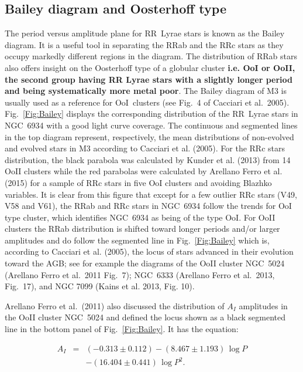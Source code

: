 \documentclass[journal]{rmaa}
\newcommand{\1}{\'{\i}}
\begin{document}
\subsection{Bailey diagram and Oosterhoff type}
\label{sec:Bailey}
The period versus amplitude plane for RR~Lyrae stars is known as the Bailey
diagram. It is a useful tool in separating the RRab and the RRc stars as they occupy
markedly different regions in the diagram. The distribution of RRab stars also
offers insight on the Oosterhoff type of a globular cluster {\bf i.e. OoI or OoII,
the second group having RR Lyrae stars with a slightly longer period and being
systematically more metal poor}. The Bailey diagram of
M3 is usually used as a reference for OoI~clusters (see Fig.~4 of Cacciari et al.\
2005).
Fig.~\ref{Fig:Bailey} displays the corresponding distribution of the RR~Lyrae stars
in NGC~6934 with a good light curve coverage. The continuous and segmented
lines in
the top diagram represent, respectively, the mean distributions of non-evolved and
evolved stars in M3 according to Cacciari et al. (2005). For the RRc stars
distribution, the black parabola was calculated by Kunder
et al. (2013) from 14 OoII clusters while the red parabolas were calculated by
Arellano Ferro et al. (2015) for a sample of RRc stars in five OoI clusters and
avoiding Blazhko variables. It is clear from this figure that except for a few
outlier RRc stars (V49, V58 and V61), the
RRab and RRc stars in NGC~6934 follow the trends for OoI type cluster, which
identifies NGC~6934 as being of the type OoI.
For OoII clusters the RRab distribution is shifted toward longer periods and/or larger
amplitudes and do follow the segmented line in Fig.~\ref{Fig:Bailey} which is,
according to Cacciari et al. (2005), the locus of stars advanced in their evolution
toward the AGB; see for example the diagrams of the OoII cluster NGC~5024 (Arellano
Ferro et al.\ 2011 Fig.~7); NGC~6333 (Arellano Ferro et al.\ 2013, Fig.~17), and NGC
7099 (Kains et al. 2013, Fig. 10).

Arellano Ferro et al.\ (2011) also discussed the distribution of $A_I$
amplitudes in the
OoII cluster NGC~5024 and defined the locus shown as a black segmented line in the
bottom panel of Fig.~\ref{Fig:Bailey}. It has the equation:

\begin{eqnarray}\label{eq:AIOoIIab}
A_I &=& (-0.313 \pm 0.112) - (8.467 \pm 1.193)\, \log P \nonumber \\
 &&- (16.404 \pm 0.441)\, \log P^2.
\end{eqnarray}
\end{document}

